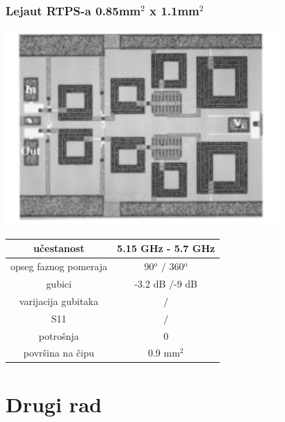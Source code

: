 \documentclass{beamer}
\begin{document}
\begin{frame}
  \frametitle{Lejaut RTPS-a 0.85mm$^2$ x 1.1mm$^2$}
  \includegraphics[width=0.7\linewidth]{layout_ellinger.png}
\end{frame}



\begin{frame}

\begin{center}
\begin{tabular}{ | c | c | }
  \hline
  učestanost & 5.15 GHz - 5.7 GHz \\
  \hline 
  opseg faznog pomeraja & 90$^o$ $/$ 360$^o$   \\  
  \hline
  gubici & -3.2 dB $/$-9 dB \\
  \hline
  varijacija gubitaka & $/$ \\
  \hline
  S11 & $/$ \\
  \hline
  potrošnja & 0 \\
  \hline
  površina na čipu & 0.9 mm$^2$  \\  
  \hline
\end{tabular}
\end{center}
\end{frame}

\section{Drugi rad}

  
\end{document}
